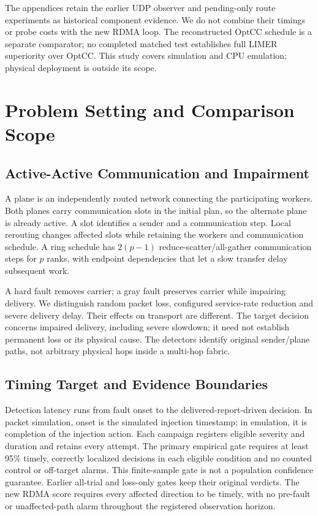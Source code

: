 \documentclass[sigconf]{acmart}
\begin{document}
The appendices retain the earlier UDP observer and pending-only route
experiments as historical component evidence. We do not combine their
timings or probe costs with the new RDMA loop. The reconstructed OptCC
schedule is a separate comparator; no completed matched test establishes
full LIMER superiority over OptCC. This study covers simulation and CPU
emulation; physical deployment is outside its scope.

\section{Problem Setting and Comparison Scope}
\label{sec:setting}
\subsection{Active-Active Communication and Impairment}
A plane is an independently routed network connecting the participating
workers. Both planes carry communication slots in the initial plan, so the
alternate plane is already active. A slot identifies a sender and a
communication step. Local rerouting changes affected slots while retaining
the workers and communication schedule. A ring schedule has $2(p-1)$
reduce-scatter/all-gather communication steps for $p$ ranks, with endpoint
dependencies that let a slow transfer delay subsequent work.

A hard fault removes carrier; a gray fault preserves carrier while
impairing delivery. We distinguish random packet loss, configured service-rate
reduction and severe delivery delay. Their effects on transport are different.
The target decision concerns impaired delivery, including severe slowdown;
it need not establish permanent loss or its physical cause. The detectors
identify original sender/plane paths, not arbitrary physical hops inside
a multi-hop fabric.

\subsection{Timing Target and Evidence Boundaries}
Detection latency runs from fault onset to the delivered-report-driven
decision. In packet simulation, onset is the simulated injection timestamp;
in emulation, it is completion of the injection action. Each campaign
registers eligible severity and duration and retains every attempt. The
primary empirical gate requires at least 95\% timely, correctly localized
decisions in each eligible condition and no counted control or off-target
alarms. This finite-sample gate is not a population confidence guarantee.
Earlier all-trial and loss-only gates keep their original verdicts. The new
RDMA score requires every affected direction to be timely, with no pre-fault
or unaffected-path alarm throughout the registered observation horizon.
\end{document}
